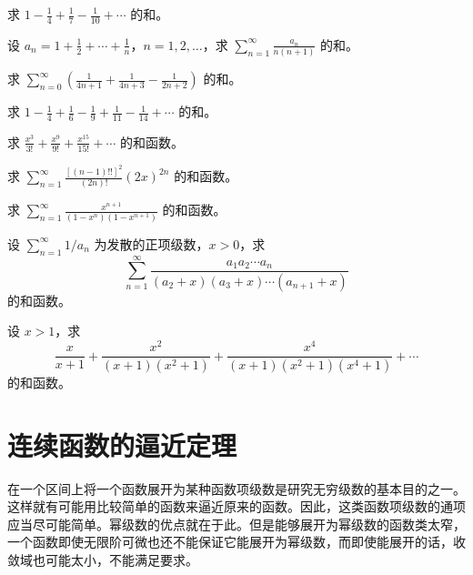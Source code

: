 \begin{xexercise}[8]
求 $\displaystyle 1-\frac14+\frac17-\frac1{10}+\cdots$ 的和。
\end{xexercise}

\begin{xexercise}[9]
设 $a_n=1+\frac12+\cdots+\frac1n$，$n=1,2,\ldots$，求 $\displaystyle\sum_{n=1}^{\infty}\frac{a_n}{n(n+1)}$ 的和。
\end{xexercise}

\begin{xexercise}[10]
求 $\displaystyle\sum_{n=0}^{\infty}\left(\frac1{4n+1}+\frac1{4n+3}-\frac1{2n+2}\right)$ 的和。
\end{xexercise}

\begin{xexercise}[11]
求 $\displaystyle 1-\frac14+\frac16-\frac19+\frac1{11}-\frac1{14}+\cdots$ 的和。
\end{xexercise}

\begin{xexercise}[12]
求 $\displaystyle \frac{x^3}{3!}+\frac{x^9}{9!}+\frac{x^{15}}{15!}+\cdots$ 的和函数。
\end{xexercise}

\begin{xexercise}[13]
求 $\displaystyle\sum_{n=1}^{\infty}\frac{[(n-1)!!]^2}{(2n)!}(2x)^{2n}$ 的和函数。
\end{xexercise}

\begin{xexercise}[14]
求 $\displaystyle\sum_{n=1}^{\infty}\frac{x^{n+1}}{(1-x^n)(1-x^{n+1})}$ 的和函数。
\end{xexercise}

\begin{xexercise}[15]
设 $\sum_{n=1}^{\infty}1/a_n$ 为发散的正项级数，$x>0$，求
\[
  \sum_{n=1}^{\infty}\frac{a_1a_2\cdots a_n}{(a_2+x)(a_3+x)\cdots(a_{n+1}+x)}
\]
的和函数。
\end{xexercise}

\begin{xexercise}[16]
设 $x>1$，求
\[
  \frac{x}{x+1}+\frac{x^2}{(x+1)(x^2+1)}
  +\frac{x^4}{(x+1)(x^2+1)(x^4+1)}+\cdots
\]
的和函数。
\end{xexercise}

\section{连续函数的逼近定理}

在一个区间上将一个函数展开为某种函数项级数是研究无穷级数的基本目的之一。这样就有可能用比较简单的函数来逼近原来的函数。因此，这类函数项级数的通项应当尽可能简单。幂级数的优点就在于此。但是能够展开为幂级数的函数类太窄，一个函数即使无限阶可微也还不能保证它能展开为幂级数，而即使能展开的话，收敛域也可能太小，不能满足要求。


